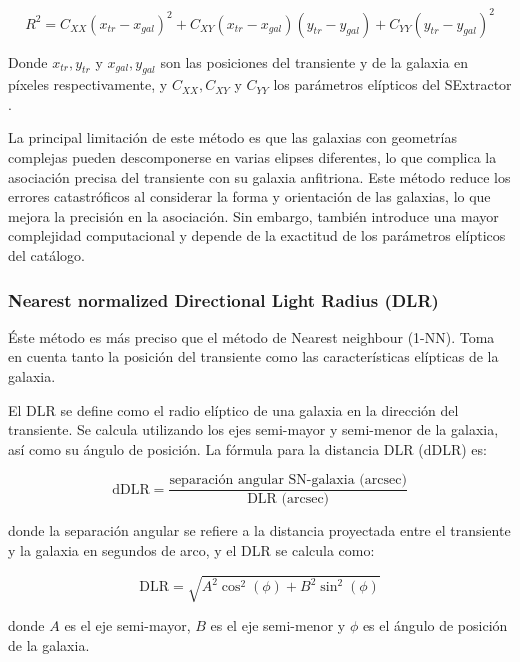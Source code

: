 \documentclass[../tesis.tex]{subfiles}
\begin{document}
\[
R^2 = C_{XX} (x_{tr} - x_{gal})^2 + C_{XY} (x_{tr} - x_{gal})(y_{tr} - y_{gal}) + C_{YY} (y_{tr} - y_{gal})^2
\]

Donde \(x_{tr}, y_{tr}\) y \(x_{gal}, y_{gal}\) son las posiciones del transiente y de la galaxia en píxeles respectivamente, y \(C_{XX}, C_{XY}\) y \(C_{YY}\) los parámetros elípticos del SExtractor \cite{sextractor}.\par\null\par 

La principal limitación de este método es que las galaxias con geometrías complejas pueden descomponerse en varias elipses diferentes, lo que complica la asociación precisa del transiente con su galaxia anfitriona. Este método reduce los errores catastróficos al considerar la forma y orientación de las galaxias, lo que mejora la precisión en la asociación. Sin embargo, también introduce una mayor complejidad computacional y depende de la exactitud de los parámetros elípticos del catálogo.\par\null\par

\subsubsection{Nearest normalized Directional Light Radius (DLR)}
Éste método es más preciso que el método de Nearest neighbour (1-NN). Toma en cuenta tanto la posición del transiente como las características elípticas de la galaxia.\par\null\par

El DLR se define como el radio elíptico de una galaxia en la dirección del transiente. Se calcula utilizando los ejes semi-mayor y semi-menor de la galaxia, así como su ángulo de posición. La fórmula para la distancia DLR (dDLR) es:\par\null\par

\[
\text{dDLR} = \frac{\text{separación angular SN-galaxia (arcsec)}}{\text{DLR (arcsec)}}
\]

donde la separación angular se refiere a la distancia proyectada entre el transiente y la galaxia en segundos de arco, y el DLR se calcula como:\par\null\par

\[
\text{DLR} = \sqrt{A^2 \cos^2(\phi) + B^2 \sin^2(\phi)}
\]

donde \(A\) es el eje semi-mayor, \(B\) es el eje semi-menor y \(\phi\) es el ángulo de posición de la galaxia.\par\null\par
\end{document}
